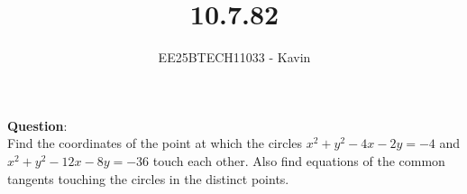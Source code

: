 \documentclass[journal]{IEEEtran}
\begin{document}

\vspace{3cm}

\title{10.7.82}
\author{EE25BTECH11033 - Kavin}
{\let\newpage\relax\maketitle}

\renewcommand{\thefigure}{\theenumi}
\renewcommand{\thetable}{\theenumi}
\setlength{\intextsep}{10pt} %
\textbf{Question}:\\
Find the coordinates of the point at which the circles $x^2+y^2-4x-2y=-4$ and $x^2+y^2-12x-8y=-36$ touch each other. Also find equations of the common tangents touching the circles in the distinct points.\\    
\bigskip
\end{document}
